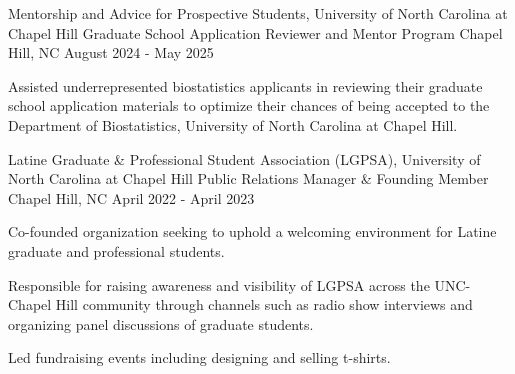 \begin{cventries}
  \cventry
    {Mentorship and Advice for Prospective Students, University of North Carolina at Chapel Hill} %
    {Graduate School Application Reviewer and Mentor Program} %
    {Chapel Hill, NC} %
    {August 2024 - May 2025} %
    {
      \begin{cvitems} %
        \item Assisted underrepresented biostatistics applicants in reviewing their graduate school application materials to \newline optimize their chances of being accepted to the Department of Biostatistics, University of North Carolina at Chapel Hill.
      \end{cvitems}
    }
    

  
  \cventry
    {Latine Graduate \& Professional Student Association (LGPSA), University of North Carolina at Chapel Hill} %
    {Public Relations Manager \& Founding Member} %
    {Chapel Hill, NC} %
    {April 2022 - April 2023} %
    {
      \begin{cvitems} %
        \item Co-founded organization seeking to uphold a welcoming environment for Latine graduate and professional students.
        \item Responsible for raising awareness and visibility of LGPSA across the UNC-Chapel Hill community through channels such as \newline radio show interviews and organizing panel discussions of graduate students.
        \item Led fundraising events including designing and selling t-shirts.
      \end{cvitems}
    }
\end{cventries}

